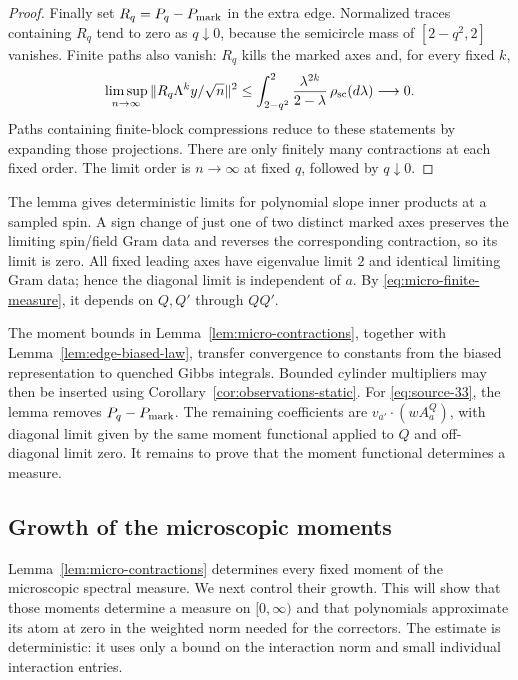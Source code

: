 \begin{proof}
Finally set $R_q=P_q-P_{\rm mark}$ in the extra edge. Normalized traces
containing $R_q$ tend to zero as $q\downarrow0$, because the semicircle
mass of $[2-q^2,2]$ vanishes. Finite paths also vanish: $R_q$ kills the
marked axes and, for every fixed $k$,
\[
 \limsup_{n\to\infty}\|R_q\Lambda^k y/\sqrt n\|^2
 \le \int_{2-q^2}^2\frac{\lambda^{2k}}{2-\lambda}
                                      \,\rho_{\rm sc}(d\lambda)
 \longrightarrow0.
\]
Paths containing finite-block compressions reduce to these statements by
expanding those projections. There are only finitely many contractions
at each fixed order. The limit order is $n\to\infty$ at fixed $q$, followed
by $q\downarrow0$.
\end{proof}

The lemma gives deterministic limits for polynomial slope inner products
at a sampled spin. A sign change of just one of two distinct marked axes
preserves the limiting spin/field Gram data and reverses the corresponding
contraction, so its limit is zero. All fixed leading axes have eigenvalue
limit $2$ and identical limiting Gram data; hence the diagonal limit is
independent of $a$. By \eqref{eq:micro-finite-measure}, it depends on $Q,Q'$
through $QQ'$.

The moment bounds in Lemma~\ref{lem:micro-contractions}, together with
Lemma~\ref{lem:edge-biased-law}, transfer convergence to constants from the
biased representation to quenched Gibbs integrals. Bounded cylinder
multipliers may then be inserted using
Corollary~\ref{cor:observations-static}. For \eqref{eq:source-33},
the lemma removes $P_q-P_{\rm mark}$. The remaining coefficients are
$v_{a'}\cdot(wA_a^Q)$, with diagonal limit given by the same moment
functional applied to $Q$ and off-diagonal limit zero.
It remains to prove that the moment functional determines a measure.

\subsection{Growth of the microscopic moments}
\label{subsec:micro-moment-growth}

Lemma~\ref{lem:micro-contractions} determines every fixed moment of the microscopic
spectral measure.  We next control their growth.  This will show that those
moments determine a measure on $[0,\infty)$ and that polynomials approximate
its atom at zero in the weighted norm needed for the correctors.  The
estimate is deterministic: it uses only a bound on the interaction norm and
small individual interaction entries.

